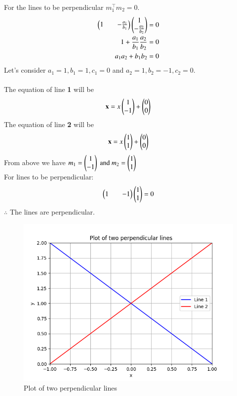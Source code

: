 \documentclass[journal]{IEEEtran}
\begin{document}
For the lines to be perpendicular $m_1^\top m_2 = 0.$\label{eq1.5.37.1}
\begin{align}
    \begin{pmatrix}1 && -\frac{a_1}{b_1}\end{pmatrix}\begin{pmatrix}1 \\ -\frac{a_2}{b_2}\end{pmatrix} = 0\\
    1 + \frac{a_1}{b_1}\frac{a_2}{b_2} = 0\\
    a_1a_2 + b_1b_2 = 0
\end{align}
Let's consider $a_1 = 1, b_1 = 1, c_1 = 0$ and 
$a_2 = 1, b_2 = -1, c_2 =0. $\\ \\
The equation of line \textbf{1} will be
\begin{align}
\mathbf{x} = x\begin{pmatrix}1 \\ -1\end{pmatrix} + \begin{pmatrix}0 \\ 0\end{pmatrix}
\end{align}
The equation of line \textbf{2} will be
\begin{align}
\mathbf{x} = x\begin{pmatrix}1 \\ 1\end{pmatrix} + \begin{pmatrix}0 \\ 0\end{pmatrix}
\end{align}
From above we have $m_1 = \begin{pmatrix}1 \\-1 \end{pmatrix} \text{ and } m_2 = \begin{pmatrix}1 \\ 1\end{pmatrix} $ \\
For lines to be perpendicular:
\begin{align}
    \begin{pmatrix}1 && -1\end{pmatrix}\begin{pmatrix}1\\ 1\end{pmatrix} = 0    
\end{align}
 $\therefore$ The lines are perpendicular.

 \begin{figure}[h!]
   \centering
   \includegraphics[width=0.7\linewidth]{figs/fig.png}
   \caption{Plot of two perpendicular lines}
   \label{stemplot}
\end{figure}
\end{document}
